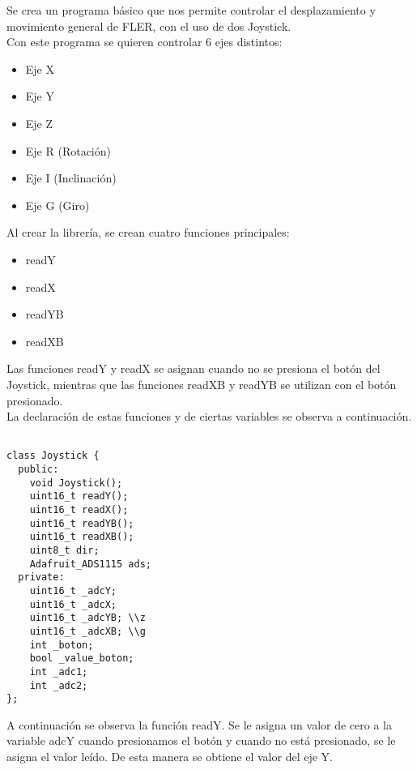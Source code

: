 \documentclass[12pt,letterpaper]{IEEEtran}
\begin{document}
Se crea un programa básico que nos permite controlar el desplazamiento y movimiento general de FLER, con el uso de dos Joystick.\\
\indent Con este programa se quieren controlar 6 ejes distintos:\\

\begin{itemize}
	\item Eje X
	\item Eje Y
	\item Eje Z
	\item Eje R (Rotación)
	\item Eje I (Inclinación)
	\item Eje G (Giro)	
\end{itemize}

\indent Al crear la librería, se crean cuatro funciones principales:

\begin{itemize}
	\item readY
	\item readX
	\item readYB
	\item readXB
\end{itemize}

\indent Las funciones readY y readX se asignan cuando no se presiona el botón del Joystick, mientras que las funciones readXB y readYB se utilizan con el botón presionado.\\

\indent La declaración de estas funciones y de ciertas variables se observa a continuación.\\

 \begin{lstlisting}

class Joystick {
  public:
    void Joystick();
    uint16_t readY();
    uint16_t readX();
    uint16_t readYB();
    uint16_t readXB();
    uint8_t dir;
    Adafruit_ADS1115 ads; 
  private:
    uint16_t _adcY;
    uint16_t _adcX;
    uint16_t _adcYB; \\z
    uint16_t _adcXB; \\g
    int _boton;
    bool _value_boton;
    int _adc1;
    int _adc2;
};

\end{lstlisting}

\indent A continuación se observa la función readY. Se le asigna un valor de cero a la variable adcY cuando presionamos el botón y cuando no está presionado, se le asigna el valor leído. De esta manera se obtiene el valor del eje Y.\\\\
\end{document}
